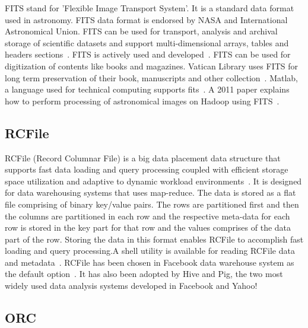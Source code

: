 {FITS stand for 'Flexible Image Transport System'. It is a standard
data format used in astronomy. FITS data format is endorsed by NASA
and International Astronomical Union. FITS can be used for transport,
analysis and archival storage of scientific datasets and support
multi-dimensional arrays, tables and headers
sections~\cite{www-fits-nasa}.  FITS is actively used and
developed~\cite{www-news-fits-2016}.  FITS can be used for
digitization of contents like books and magazines. Vatican Library
uses FITS for long term preservation of their book, manuscripts and
other collection~\cite{www-fits-vatican-library}. Matlab, a language
used for technical computing supports fits~\cite{www-fits-matlab}. A
2011 paper explains how to perform processing of astronomical images
on Hadoop using FITS~\cite{paper-fits-2011}.

     \pv

\subsection{RCFile}

RCFile (Record Columnar File) is a big data placement data structure
that supports fast data loading and query processing coupled with
efficient storage space utilization and adaptive to dynamic workload
environments~\cite{www-rcfile-wiki}.  It is designed for data
warehousing systems that uses map-reduce. The data is stored as a flat
file comprising of binary key/value pairs. The rows are partitioned
first and then the columns are partitioned in each row and the
respective meta-data for each row is stored in the key part for that
row and the values comprises of the data part of the row. Storing the
data in this format enables RCFile to accomplish fast loading and
query processing.A shell utility is available for reading RCFile data
and metadata~\cite{www-rcfile-cat}. RCFile has been chosen in Facebook
data warehouse system as the default option~\cite{he2011rcfile}. It
has also been adopted by Hive and Pig, the two most widely used data
analysis systems developed in Facebook and Yahoo!

     \pv

\subsection{ORC}

}
